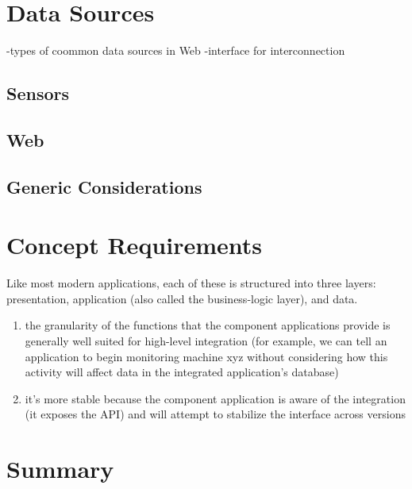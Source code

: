 \section {Data Sources}
-types of coommon data sources in Web
\newline
-interface for interconnection
\subsection {Sensors}

\subsection {Web}
\subsection {Generic Considerations}

\section{Concept Requirements}
Like most modern applications, each of these is structured into three layers: presentation, 
application (also called the business-logic layer), and data.
\begin{enumerate}
\item the granularity of the functions that the component applications provide is generally well
suited for high-level integration (for example, we can tell an application to begin monitoring
machine xyz without considering how this activity will affect data in the integrated application’s database)
\item it’s more stable because the component application is aware of the integration (it exposes
the API) and will attempt to stabilize the interface across versions
\end{enumerate}

\section{Summary}